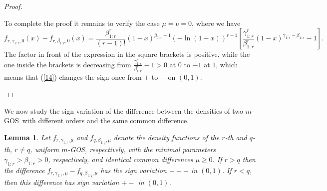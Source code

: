 \documentclass [11pt]{article}
\newtheorem{lemma}{Lemma}
\newcommand{\gos}{GOS}
\begin{document}
\begin{proof}
\begin{enumerate}
    \smallskip
    
    To complete the proof it remains to verify the case $\mu=\nu=0$, where we have
    \begin{equation}
    f_{r,\gamma_{1:r},0}(x) - f_{r,\beta_{1:r},0}(x)  
    = 
    \frac{\beta^r_{1:r}}{(r\!-\!1)!}(1-x)^{\beta_{1:r}-1}(-\ln (1-x))^{r-1}
    \left[ \frac{\gamma^r_{1:r}}{\beta^r_{1:r}}(1\!-\!x)^{\gamma_{1:r}-\beta_{1:r}}-1
    \right].
    \label{14}
    \end{equation}
    The factor in front of the expression in the square brackets is positive, while the one inside the brackets is decreasing from
    $\frac{\gamma^r_{1:r}}{\beta^r_{1:r}}-1 >0$ at $0$ to $-1$ at $1$, which means that (\ref{14}) changes the sign once from $+$ to $-$
    on $(0,1)$.
\end{enumerate}
\end{proof}
We now study the sign variation of the difference between the densities of two $m$-\gos\ with different orders and the same common difference.
\begin{lemma}\label{t11}
Let $f_{r,\gamma_{1:r},\mu}$ and $f_{q,\beta_{1:q},\mu}$ denote the density functions of the $r$-th  and $q$-th, $r \neq q$, uniform $m$-\gos, respectively,  
with the minimal parameters $\gamma_{1:r} > \beta_{1:r}>0$, respectively, and identical common differences $\mu \geq 0$. 
If $r>q$ then the difference $f_{r,\gamma_{1:r}, \mu} - f_{q, \beta_{1:q}, \mu}$ has the sign variation $-+-$ in $(0,1)$. If $r<q$, then this difference has sign variation $+-$ in $(0,1)$.
\end{lemma} 
\end{document}
